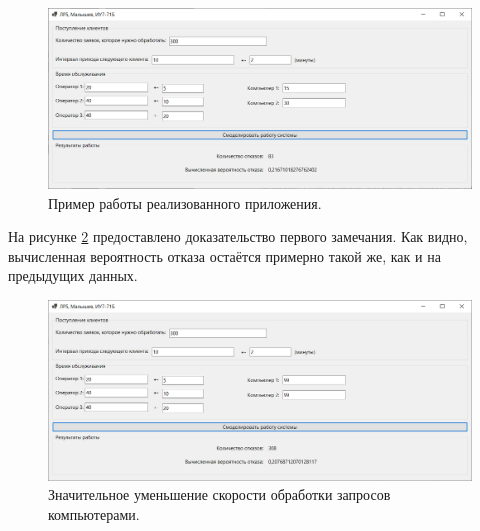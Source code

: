 \documentclass[14pt]{extreport}
\begin{document}
\begin{figure}[H]
	\begin{center}
		\includegraphics[scale=0.8]{imgs/res2.png}
	\end{center}
	\caption{Пример работы реализованного приложения.}
	\label{img:res2}
\end{figure}

На рисунке \ref{img:res3} предоставлено доказательство первого замечания. Как видно, вычисленная вероятность отказа остаётся примерно такой же, как и на предыдущих данных.

\begin{figure}[H]
	\begin{center}
		\includegraphics[scale=0.8]{imgs/res3.png}
	\end{center}
	\caption{Значительное уменьшение скорости обработки запросов компьютерами.}
	\label{img:res3}
\end{figure}
\end{document}
